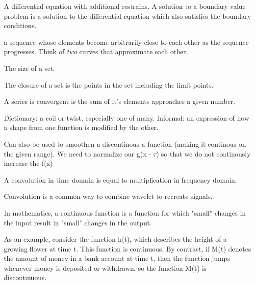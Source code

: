 \begin{definition}
    A differential equation with additional restrains. A solution to a boundary
    value problem is a solution to the differential equation which also
    satisfies the boundary conditions.
    
\end{definition}


\begin{definition}
    a sequence whose elements become arbitrarily close to each other as the
    sequence progresses.
    Think of \textit{two} curves that approximate each other.

\end{definition}

\begin{definition}
    The size of a set.
\end{definition}

\begin{definition}[Closure]
    The closure of a set is the points in the set including the limit points.
\end{definition}

\begin{definition}[Convergence]\label{convergence}
    A series is convergent is the sum of it's elements approaches a given 
    number.
\end{definition}

\begin{definition}[Convolution]
    Dictionary: a coil or twist, especially one of many.\newline
    Informal: an expression of how a shape from one function is modified by 
        the other.

    Can also be used to smoothen a discontinous a function (making it continous 
    on the given range). We need to normalize our g(x - $\tau$) so that we do
    not continously increase the f(x)

    A convolution in time domain is equal to multiplication in frequency domain.

    Convolution is a common way to combine wavelet to recreate signals.
\end{definition}

\begin{definition}[Continuous]
In mathematics, a continuous function is a function for which
"small" changes in the input result in "small" changes in the output.

As an example, consider the function h(t), which describes the height of a
growing flower at time t. This function is continuous. By contrast, if M(t)
denotes the amount of money in a bank account at time t, then the function
jumps whenever money is deposited or withdrawn, so the function M(t) is
discontinuous.

\end{definition}

